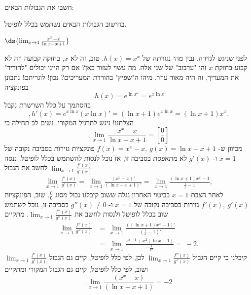 חשבו את הגבולות הבאים:
\begin{solbox}
בחישוב הגבולות הבאים נשתמש בכלל לופיטל.
\end{solbox}
\bE{}
\item $\ds{\lim_{x \to 1} \frac{x^x - x}{\ln x - x + 1}} $
\begin{solbox}
לפני שניגש לגזירה, נבין מהי נגזרתה של
$h(x)=x^x$.
טוב, זה לא
$x$,
בחזקה קבועה וזה לא קבוע בחזקת
$x$
זהו "ערבוב" של שני אלה.
מה עשוי לעזור כאן?
אם רק היינו יכולים "להוריד" את המעריך, זה היה מאוד עוזר. מיהו ה"שפיץ" בהורדת המעריכים?
נכון! לוגריתם!
נתבונן בפונקציה
$$.h(x)=e^{\ln x^x}=e^{x\ln x}$$
בהסתמך על כלל השרשרת נקבל
$$,h'(x)=e^{x\ln x}(x\ln x)'=(\ln x+1)e^{x\ln x}=(\ln x+1)x^x.$$
הצלחנו!
ניגש לתרגיל המקורי.
נשים לב תחילה כי
$$,\lim_{x \to 1} \frac{x^x - x}{\ln x - x + 1}=\left[\frac{0}{0}\right]$$
מכיוון ש-
$f(x)=x^x - x,\ g(x)=\ln x - x + 1$
פונקציות גזירות בסביבה נקובה של
$x=1$
ו-
$g'(x)$
לא מתאפסת בסביבה זו,
אז נוכל לנסות להשתמש בכלל לופיטל.
ננסה לחשב את הגבול
$\lim_{x \to 1} \frac{f'(x)}{g'(x)}$
\begin{align*}
    \lim_{x \to 1} \frac{f'(x)}{g'(x)}=\ \lim_{x \to 1} \frac{\left(x^x - x\right)'}{(\ln x - x + 1)'}
    =\ \lim_{x \to 1}\frac{(\ln x+1)x^x-1}{\frac{1}{x}-1},
\end{align*}
לאחר הצבת
$x=1$
בביטוי האחרון נגלה ששוב קיבלנו גבול מסוג
$\frac{0}{0}$.
שוב, הפונקציות
$f'(x),\ g'(x)$
גזירות בסביבה נקובה של
$x=1$
ו-
$g''(x)\neq 0$
בסביבה זו,
נוכל לשתמש שוב בכלל לופיטל ולנסות לחשב את
$\displaystyle\lim_{x \to 1}\frac{f''(x)}{g''(x)}$.
מתקיים
\begin{align*}
    \lim_{x \to 1}\frac{f''(x)}{g''(x)}&=\ \lim_{x \to 1}\frac{\left((\ln x+1)x^x-1\right)'}{\left(\frac{1}{x}-1\right)'}\\
    &=\ \lim_{x \to 1}\frac{x^{x-1}+x^2(\ln x+1)}{-\frac{1}{x^2}}
    =\ -2.
\end{align*}
קיבלנו כי קיים הגבול
$\displaystyle\lim_{x \to 1} \frac{f''(x)}{g''(x)}$
לכן, לפי כלל לופיטל, קיים גם הגבול
$\lim_{x \to 1} \frac{f'(x)}{g'(x)}$
ושוב, לפי כלל לופיטל, קיים גם הגבול המקורי ומתקיים
$$.\lim_{x \to 1} \frac{\left(x^x - x\right)}{(\ln x - x + 1)}=-2$$
\end{solbox}

